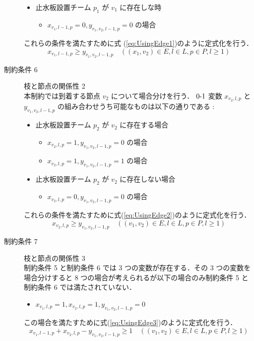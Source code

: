 \documentclass[a4paper,12pt,fleqn]{jarticle}
\begin{document}
\begin{description}
\begin{itemize}
  \item 止水板設置チーム $p_1$ が $v_1$ に存在しな時
    \begin{itemize}
    \item $x_{v_1,l-1,p}=0, y_{v_1,v_2,l-1,p}=0$ の場合
    \end{itemize}
  \end{itemize}

  これらの条件を満たすために式 (\ref{eq:UsingEdge1})のように定式化を行う．
  \begin{equation}
    x_{v_1,l-1,p}\geq y_{v_1,v_2,l-1,p}
    \quad ((x_1,v_2)\in E,l \in L,p \in P,l \geq 1)
    \label{eq:UsingEdge1}
  \end{equation}
  
\item [制約条件 6] 枝と節点の関係性 2\\
  本制約では到着する節点 $v_2$ について場合分けを行う．
  $0\mathchar`-1$ 変数 $x_{v_2,l,p}$ と $y_{v_1,v_2,l-1,p}$ の組み合わせうち可能なものは以下の通りである :
  \begin{itemize}
  \item 止水板設置チーム $p_2$ が $v_2$ に存在する場合
    \begin{itemize}
    \item $x_{v_2,l,p}=1, y_{v_1,v_2,l-1,p}=0$ の場合
    \item $x_{v_2,l,p}=1, y_{v_1,v_2,l-1,p}=1$ の場合
    \end{itemize}
  \item 止水板設置チーム $p_2$ が $v_2$ に存在しない場合
    \begin{itemize}
    \item $x_{v_2,l,p}=0, y_{v_1,v_2,l-1,p}=0$ の場合
    \end{itemize}
  \end{itemize}

  これらの条件を満たすために式(\ref{eq:UsingEdge2})のように定式化を行う．
  \begin{equation}
    x_{v_2,l,p}\geq y_{v_1,v_2,l-1,p} \quad ((v_1,v_2)\in E,l \in L,p \in P,l \geq 1)\label{eq:UsingEdge2}
  \end{equation}

\item [制約条件 7] 枝と節点の関係性 3\\
  制約条件 5 と制約条件 6 では 3 つの変数が存在する．その 3 つの変数を場合分けすると 8 つの場合が考えられるが以下の場合のみ制約条件 5 と制約条件 6 では満たされていない．
  \begin{itemize}
  \item $x_{v_1,l,p}=1, x_{v_2,l,p}=1, y_{v_1,v_2,l-1,p}=0$
  \end{itemize}
  この場合を満たすために式(\ref{eq:UsingEdge3})のように定式化を行う．
  \begin{equation}
    x_{v_1,l-1,p}+x_{v_2,l,p}-y_{v_1,v_2,l-1,p} \geq 1
    \quad ((v_1,v_2) \in E,l \in L,p \in P, l \geq 1)\label{eq:UsingEdge3}
  \end{equation}


\end{description}
\end{document}
